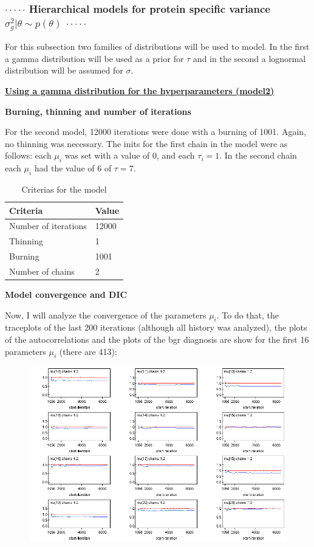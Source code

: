\documentclass{article}
\begin{document}
\newpage


\subsubsection*{$\cdot\cdot\cdot\cdot\cdot$ Hierarchical models for protein specific variance $\sigma_g^2 | \theta \sim p(\theta)$ $\cdot\cdot\cdot\cdot\cdot$ }
For this subsection two families of distributions will be used to model. In the first a gamma distribution will be used as a prior for $\tau$ and in the second a lognormal distribution will be assumed for $\sigma$.

\underline{\textbf{Using a gamma distribution for the hyperparameters (model2)}}

\textbf{Burning, thinning and number of iterations}

For the second model, 12000 iterations were done with a burning of 1001. Again, no thinning was necessary. The inits for the first chain in the model were as follows: each $\mu_i$ was set with a value of 0, and each $\tau_i=1$. In the second chain each $\mu_i$ had the value of 6 of $\tau = 7$.  

\begin{table}[ht!]
\centering
\caption{Criterias for the model}
\begin{tabular}{|l|l|}
\hline
Criteria             & Value \\ \hline
Number of iterations & 12000 \\ \hline
Thinning             & 1    \\ \hline
Burning              & 1001  \\ \hline
Number of chains     & 2     \\ \hline
\end{tabular}
\end{table}

\textbf{Model convergence and DIC}

Now, I will analyze the convergence of the parameters $\mu_i$. To do that, the traceplots of the last 200 iterations (although all history was analyzed), the plots of the autocorrelations and the plots of the bgr diagnosis are show for the first 16 parameters $\mu_i$ (there are 413):

\begin{figure}[ht!]
\centering
\includegraphics[width=14cm]{figures/model2_mu2.png}
\end{figure}
\end{document}
